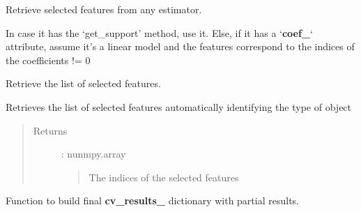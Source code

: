\documentclass[letterpaper,10pt,english]{sphinxmanual}
\begin{document}
\begin{fulllineitems}
\label{\detokenize{api:palladio.utils.retrieve_features}}
Retrieve selected features from any estimator.

In case it has the `get\_support' method, use it.
Else, if it has a `{\color{red}\bfseries{}coef\_}` attribute, assume it's a linear model and the
features correspond to the indices of the coefficients != 0

\end{fulllineitems}


\begin{fulllineitems}
\label{\detokenize{api:palladio.utils.get_selected_list}}
Retrieve the list of selected features.

Retrieves the list of selected features automatically identifying the
type of object
\begin{quote}\begin{description}
\item[{Returns}] \leavevmode
{} : nunmpy.array
\begin{quote}

The indices of the selected features
\end{quote}

\end{description}\end{quote}

\end{fulllineitems}


\begin{fulllineitems}
\label{\detokenize{api:palladio.utils.build_cv_results}}
Function to build final {\color{red}\bfseries{}cv\_results\_} dictionary with partial results.

\end{fulllineitems}

\end{document}
